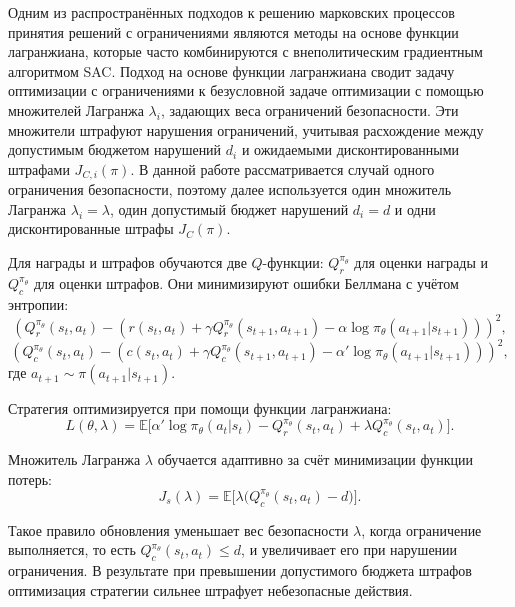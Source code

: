 Одним из распространённых подходов к решению марковских процессов принятия решений с ограничениями являются методы на основе функции лагранжиана, которые часто комбинируются с внеполитическим градиентным алгоритмом SAC. Подход на основе функции лагранжиана сводит задачу оптимизации с ограничениями к безусловной задаче оптимизации с помощью множителей Лагранжа $\lambda_i$, задающих веса ограничений безопасности. Эти множители штрафуют нарушения ограничений, учитывая расхождение между допустимым бюджетом нарушений $d_i$ и ожидаемыми дисконтированными штрафами $J_{C,i}(\pi)$. В данной работе рассматривается случай одного ограничения безопасности, поэтому далее используется один множитель Лагранжа $\lambda_i = \lambda$, один допустимый бюджет нарушений $d_i = d$ и одни дисконтированные штрафы $J_C(\pi)$.

Для награды и штрафов обучаются две $Q$-функции: $Q^{\pi_\theta}_r$ для оценки награды и $Q^{\pi_\theta}_c$ для оценки штрафов. Они минимизируют ошибки Беллмана с учётом энтропии:
\begin{equation}
\left(
Q^{\pi_\theta}_r(s_t,a_t)
-
\left(
r(s_t,a_t)
+
\gamma Q^{\pi_\theta}_r(s_{t+1},a_{t+1})
-
\alpha \log \pi_\theta(a_{t+1}|s_{t+1})
\right)
\right)^2,
\end{equation}
\begin{equation}
\left(
Q^{\pi_\theta}_c(s_t,a_t)
-
\left(
c(s_t,a_t)
+
\gamma Q^{\pi_\theta}_c(s_{t+1},a_{t+1})
-
\alpha' \log \pi_\theta(a_{t+1}|s_{t+1})
\right)
\right)^2,
\end{equation}
где $a_{t+1} \sim \pi(a_{t+1}|s_{t+1})$.

Стратегия оптимизируется при помощи функции лагранжиана:
\begin{equation}
\label{eq:sgsafe_sac_lagrangian}
L(\theta,\lambda)=
\mathbb{E}\Big[
\alpha' \log \pi_{\theta}(a_t|s_t)
-
Q^{\pi_\theta}_r(s_t,a_t)
+
\lambda Q^{\pi_\theta}_c(s_t,a_t)
\Big].
\end{equation}

Множитель Лагранжа $\lambda$ обучается адаптивно за счёт минимизации функции потерь:
\begin{equation}
\label{eq:sgsafe_multiplier_optimization}
J_s(\lambda)=
\mathbb{E}\Big[\lambda\big(Q^{\pi_\theta}_c(s_t,a_t)-d\big)\Big].
\end{equation}

Такое правило обновления уменьшает вес безопасности $\lambda$, когда ограничение выполняется, то есть $Q^{\pi_\theta}_c(s_t,a_t) \leq d$, и увеличивает его при нарушении ограничения. В результате при превышении допустимого бюджета штрафов оптимизация стратегии сильнее штрафует небезопасные действия.

